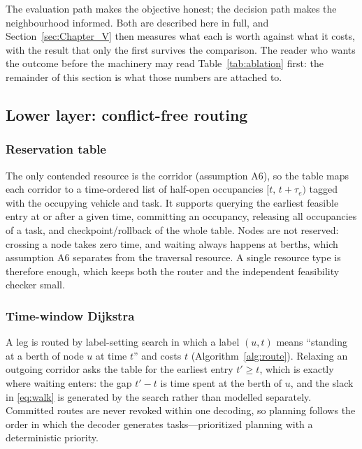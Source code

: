 \documentclass[manuscript,screen,review]{acmart}
\begin{document}
The evaluation path makes the objective honest; the decision path makes the
neighbourhood informed. Both are described here in full, and
Section~\ref{sec:Chapter_V} then measures what each is worth against what it
costs, with the result that only the first survives the comparison. The reader who
wants the outcome before the machinery may read Table~\ref{tab:ablation} first:
the remainder of this section is what those numbers are attached to.


\subsection{Lower layer: conflict-free routing}
\label{sec:router}

\subsubsection{Reservation table}
The only contended resource is the corridor (assumption A6), so the table maps
each corridor to a time-ordered list of half-open occupancies
$[t,\,t+\tau_e)$ tagged with the occupying vehicle and task. It supports
querying the earliest feasible entry at or after a given time, committing an
occupancy, releasing all occupancies of a task, and checkpoint/rollback of the
whole table. Nodes are not reserved: crossing a node takes zero time, and
waiting always happens at berths, which assumption A6 separates from the
traversal resource. A single resource type is therefore enough, which keeps
both the router and the independent feasibility checker small.

\subsubsection{Time-window Dijkstra}
A leg is routed by label-setting search in which a label $(u,t)$ means
``standing at a berth of node $u$ at time $t$'' and costs $t$
(Algorithm~\ref{alg:route}). Relaxing an outgoing corridor asks the table for
the earliest entry $t'\ge t$, which is exactly where waiting enters: the gap
$t'-t$ is time spent at the berth of $u$, and the slack in \eqref{eq:walk} is
generated by the search rather than modelled separately. Committed routes are
never revoked within one decoding, so planning follows the order in which the
decoder generates tasks---prioritized planning with a deterministic priority.
\end{document}

